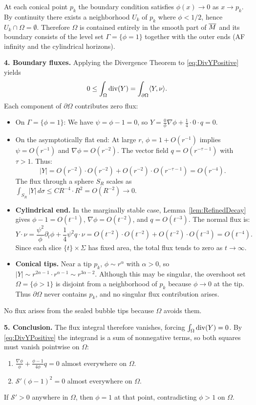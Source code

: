 At each conical point $p_k$ the boundary condition satisfies $\phi(x) \to 0$ as $x \to p_k$. By continuity there exists a neighborhood $U_k$ of $p_k$ where $\phi < 1/2$, hence $U_k \cap \Omega = \emptyset$. Therefore $\Omega$ is contained entirely in the smooth part of $\overline{M}$ and its boundary consists of the level set $\Gamma = \{\phi=1\}$ together with the outer ends (AF infinity and the cylindrical horizons).

\textbf{4. Boundary fluxes.}
Applying the Divergence Theorem to \eqref{eq:DivYPositive} yields
\[ 0 \le \int_\Omega \mathrm{div}(Y) = \int_{\partial \Omega} \langle Y, \nu \rangle. \]
Each component of $\partial \Omega$ contributes zero flux:
\begin{itemize}
    \item On $\Gamma = \{\phi = 1\}$: We have $\psi = \phi - 1 = 0$, so $Y = \frac{0}{\phi}\nabla\phi + \frac{1}{4}\cdot 0 \cdot q = 0$.
    \item On the asymptotically flat end: At large $r$, $\phi = 1 + O(r^{-1})$ implies $\psi = O(r^{-1})$ and $\nabla\phi = O(r^{-2})$. The vector field $q = O(r^{-\tau-1})$ with $\tau > 1$. Thus:
    \[
        |Y| = O(r^{-2}) \cdot O(r^{-2}) + O(r^{-2}) \cdot O(r^{-\tau-1}) = O(r^{-4}).
    \]
    The flux through a sphere $S_R$ scales as $\int_{S_R} |Y| \, d\sigma \le C R^{-4} \cdot R^2 = O(R^{-2}) \to 0$.
    \item \textbf{Cylindrical end.} In the marginally stable case, Lemma~\ref{lem:RefinedDecay} gives $\phi-1 = O(t^{-1})$, $\nabla\phi = O(t^{-2})$, and $q = O(t^{-3})$. The normal flux is:
    \[
        Y \cdot \nu = \frac{\psi^2}{\phi}\partial_t\phi + \frac{1}{4}\psi^2 q \cdot \nu = O(t^{-2}) \cdot O(t^{-2}) + O(t^{-2}) \cdot O(t^{-3}) = O(t^{-4}).
    \]
    Since each slice $\{t\} \times \Sigma$ has fixed area, the total flux tends to zero as $t \to \infty$.
    \item \textbf{Conical tips.} Near a tip $p_k$, $\phi \sim r^\alpha$ with $\alpha>0$, so $|Y| \sim r^{2\alpha-1} \cdot r^{\alpha-1} \sim r^{3\alpha-2}$. Although this may be singular, the overshoot set $\Omega=\{\phi>1\}$ is disjoint from a neighborhood of $p_k$ because $\phi\to 0$ at the tip. Thus $\partial \Omega$ never contains $p_k$, and no singular flux contribution arises.
\end{itemize}
No flux arises from the sealed bubble tips because $\Omega$ avoids them.

\textbf{5. Conclusion.}
The flux integral therefore vanishes, forcing $\int_\Omega \mathrm{div}(Y) = 0$. By \eqref{eq:DivYPositive} the integrand is a sum of nonnegative terms, so both squares must vanish pointwise on $\Omega$:
\begin{enumerate}
    \item $\frac{\nabla \phi}{\phi} + \frac{\phi-1}{4\phi} q = 0$ almost everywhere on $\Omega$.
    \item $\mathcal{S}'(\phi-1)^2 = 0$ almost everywhere on $\Omega$.
\end{enumerate}
If $\mathcal{S}' > 0$ anywhere in $\Omega$, then $\phi = 1$ at that point, contradicting $\phi > 1$ on $\Omega$. 

